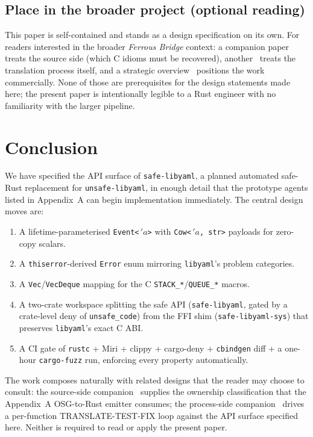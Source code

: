 \documentclass[12pt]{article}
\theoremstyle{definition}
\theoremstyle{remark}
\newcommand{\lifetime}[1]{\ensuremath{\,'\!#1}}
\begin{document}
\subsection{Place in the broader project (optional reading)}

This paper is self-contained and stands as a design specification on its
own. For readers interested in the broader \emph{Ferrous Bridge}
context: a companion paper~\cite{long-c} treats the source side
(which C idioms must be recovered), another~\cite{long-transpile} treats
the translation process itself, and a strategic
overview~\cite{long-c2rust-strategy} positions the work commercially.
None of those are prerequisites for the design statements made here; the
present paper is intentionally legible to a Rust engineer with no
familiarity with the larger pipeline.

\section{Conclusion}
\label{sec:concl}

We have specified the API surface of \texttt{safe-libyaml}, a planned
automated safe-Rust replacement for \texttt{unsafe-libyaml}, in enough
detail that the prototype agents listed in Appendix~A can begin
implementation immediately. The central design moves are:

\begin{enumerate}[leftmargin=2em]
\item A lifetime-parameterised \texttt{Event<\lifetime{a}>} with
\texttt{Cow<\lifetime{a}, str>} payloads for zero-copy scalars.
\item A \texttt{thiserror}-derived \texttt{Error} enum mirroring
\texttt{libyaml}'s problem categories.
\item A \texttt{Vec}/\texttt{VecDeque} mapping for the C
\texttt{STACK\_*}/\texttt{QUEUE\_*} macros.
\item A two-crate workspace splitting the safe API (\texttt{safe-libyaml},
gated by a crate-level deny of \texttt{unsafe\_code}) from the FFI shim
(\texttt{safe-libyaml-sys}) that preserves \texttt{libyaml}'s exact C ABI.
\item A CI gate of \texttt{rustc} + Miri + clippy + cargo-deny +
\texttt{cbindgen} diff + a one-hour \texttt{cargo-fuzz} run, enforcing
every property automatically.
\end{enumerate}

The work composes naturally with related designs that the reader may
choose to consult: the source-side companion~\cite{long-c} supplies the
ownership classification that the Appendix~A OSG-to-Rust emitter consumes;
the process-side companion~\cite{long-transpile} drives a per-function
TRANSLATE-TEST-FIX loop against the API surface specified here. Neither
is required to read or apply the present paper.
\end{document}
